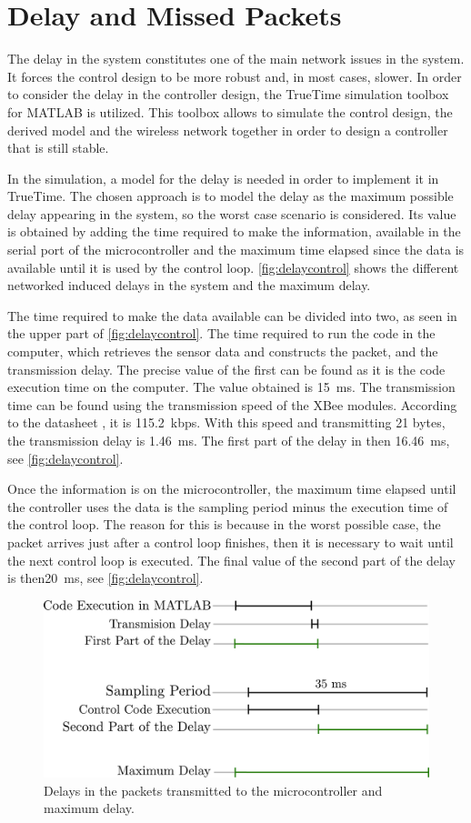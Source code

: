\section{Delay and Missed Packets}
The delay in the system constitutes one of the main network issues in the system. It forces the control design to be more robust and, in most cases, slower. In order to consider the delay in the controller design, the TrueTime simulation toolbox for MATLAB is utilized. This toolbox allows to simulate the control design, the derived model and the wireless network together in order to design a controller that is still stable.

In the simulation, a model for the delay is needed in order to implement it in TrueTime. The chosen approach is to model the delay as the maximum possible delay appearing in the system, so the worst case scenario is considered. Its value is obtained by adding the time required to make the information, available in the serial port of the microcontroller and the maximum time elapsed since the data is available until it is used by the control loop. \autoref{fig:delaycontrol} shows the different networked induced delays in the system and the maximum delay.  

The time required to make the data available can be divided into two, as seen in the upper part of \autoref{fig:delaycontrol}. The time required to run the code in the computer, which retrieves the sensor data and constructs the packet, and the transmission delay. The precise value of the first can be found as it is the code execution time on the computer. The value obtained is \SI{15}{ms}. The transmission time can be found using the transmission speed of the XBee modules. According to the datasheet \cite{XBee}, it is \SI{115.2}{kbps}. With this speed and transmitting 21 bytes, the transmission delay is \SI{1.46}{ms}. The first part of the delay in then \SI{16.46}{ms}, see \autoref{fig:delaycontrol}.

Once the information is on the microcontroller, the maximum time elapsed until the controller uses the data is the sampling period minus the execution time of the control loop. The reason for this is because in the worst possible case, the packet arrives just after a control loop finishes, then it is necessary to wait until the next control loop is executed. The final value of the second part of the delay is then\SI{20}{ms}, see \autoref{fig:delaycontrol}.
 
\begin{figure}[H]
	\centering
	\includegraphics[width=.6\textwidth]{figures/maxDelay.pdf}
	\caption{Delays in the packets transmitted to the microcontroller and maximum delay.}
	\label{fig:delaycontrol}
\end{figure}

